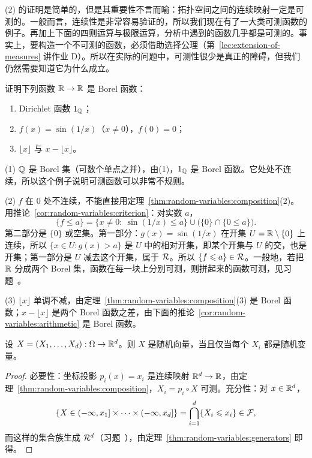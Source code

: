 \begin{remark}
(2) 的证明是简单的，但是其重要性不言而喻：拓扑空间之间的连续映射一定是可测的。一般而言，连续性是非常容易验证的，所以我们现在有了一大类可测函数的例子。再加上下面的四则运算与极限运算，分析中遇到的函数几乎都是可测的。事实上，要构造一个不可测的函数，必须借助选择公理（第~\ref{lec:extension-of-measures} 讲作业 D）。所以在实际的问题中，可测性很少是真正的障碍，但我们仍然需要知道它为什么成立。
\end{remark}

\begin{workedexample}\label{we:random-variables:borel-functions}
证明下列函数 $\mathbb{R}\to\mathbb{R}$ 是 Borel 函数：
\begin{enumerate}
\item Dirichlet 函数 $1_{\mathbb{Q}}$；
\item $f(x)=\sin(1/x)$（$x\neq0$），$f(0)=0$；
\item $\lfloor x\rfloor$ 与 $x-\lfloor x\rfloor$。
\end{enumerate}
\end{workedexample}
\begin{solution}
(1) $\mathbb{Q}$ 是 Borel 集（可数个单点之并），由(1)，$1_{\mathbb{Q}}$ 是 Borel 函数。它处处不连续，所以这个例子说明可测函数可以非常不规则。

(2) $f$ 在 $0$ 处不连续，不能直接用定理~\ref{thm:random-variables:composition}(2)。用推论~\ref{cor:random-variables:criterion}：对实数 $a$，
\[
\{f\leqslant a\}=\{x\neq0:\ \sin(1/x)\leqslant a\}\cup\bigl(\{0\}\cap\{0\leqslant a\}\bigr).
\]
第二部分是 $\{0\}$ 或空集。第一部分：$g(x)=\sin(1/x)$ 在开集 $U=\mathbb{R}\setminus\{0\}$ 上连续，所以 $\{x\in U:g(x)>a\}$ 是 $U$ 中的相对开集，即某个开集与 $U$ 的交，也是开集；第一部分是 $U$ 减去这个开集，属于 $\mathcal{R}$。所以 $\{f\leqslant a\}\in\mathcal{R}$。一般地，若把 $\mathbb{R}$ 分成两个 Borel 集，函数在每一块上分别可测，则拼起来的函数可测，见习题~。

(3) $\lfloor x\rfloor$ 单调不减，由定理~\ref{thm:random-variables:composition}(3) 是 Borel 函数；$x-\lfloor x\rfloor$ 是两个 Borel 函数之差，由下面的推论~\ref{cor:random-variables:arithmetic} 是 Borel 函数。
\end{solution}

\begin{theorem}[随机向量与分量]\label{thm:random-variables:vector}
设 $X=(X_1,\dots,X_d):\Omega\to\mathbb{R}^d$。则 $X$ 是随机向量，当且仅当每个 $X_i$ 都是随机变量。
\end{theorem}
\begin{proof}
必要性：坐标投影 $p_i(x)=x_i$ 是连续映射 $\mathbb{R}^d\to\mathbb{R}$，由定理~\ref{thm:random-variables:composition}，$X_i=p_i\circ X$ 可测。充分性：对 $x\in\mathbb{R}^d$，
\[
\{X\in(-\infty,x_1]\times\cdots\times(-\infty,x_d]\}=\bigcap_{i=1}^d\{X_i\leqslant x_i\}\in\mathcal{F},
\]
而这样的集合族生成 $\mathcal{R}^d$（习题~），由定理~\ref{thm:random-variables:generators} 即得。
\end{proof}

